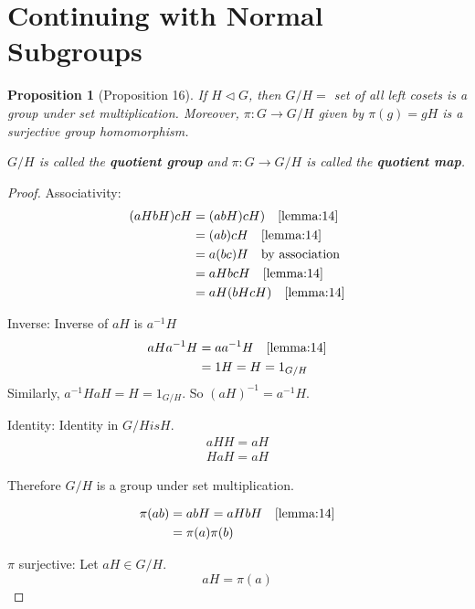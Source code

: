 \documentclass[11pt, oneside]{book}
\theoremstyle{break}
\newtheorem*{proof}{Proof}
\newtheorem{propo}{Proposition}[section]
\begin{document}
\section{Continuing with Normal Subgroups}\label{sect:normal subgroups cont}

\begin{propo}[Proposition 16]\label{propo:16}
    If $H \triangleleft G$, then $G / H =$ set of all left cosets is a group under set multiplication. Moreover, $\pi : G \to G / H$ given by $\pi(g) = gH$ is a surjective group homomorphism.

    $G / H$ is called the \textbf{quotient group} and $\pi : G \to G / H$ is called the \textbf{quotient map}.
\end{propo}

\begin{proof}
    Associativity:
    \begin{align*}
        (aHbH)cH &= (abH)cH) \quad \autoref{lemma:14} \\
            &= (ab)cH \quad \autoref{lemma:14} \\
            &= a(bc)H \quad \text{by association} \\
            &= aHbcH \quad \autoref{lemma:14} \\
            &= aH(bHcH) \quad \autoref{lemma:14}
    \end{align*}

    Inverse: Inverse of $aH$ is $a^{-1}H$
    \begin{align*}
        aHa^{-1}H &= aa^{-1}H \quad \autoref{lemma:14} \\
            &= 1H = H = 1_{G/H}
    \end{align*}
    Similarly, $a^{-1}HaH = H = 1_{G/H}$. So $(aH)^{-1} = a^{-1}H$.

    Identity: Identity in $G/H is H$.
    \begin{gather*}
        aHH = aH \\
        HaH = aH
    \end{gather*}

    Therefore $G/H$ is a group under set multiplication.

    \begin{align*}
        \pi(ab) &= abH = aHbH \quad \autoref{lemma:14} \\
            &= \pi(a) \pi(b)
    \end{align*}

    $\pi$ surjective: Let $aH \in G/H$.
    \begin{equation}
        aH = \pi(a)
    \end{equation}
\end{proof}
\end{document}

